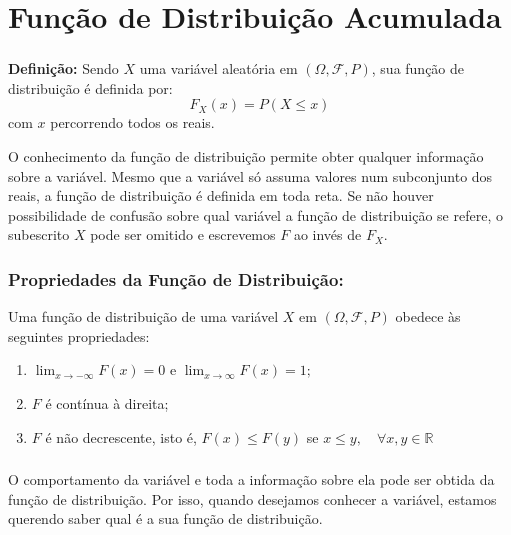 \documentclass[14pt,aspectratio=1610]{beamer}
\begin{document}
\section{Função de Distribuição Acumulada}
\begin{frame}{}
\frametitle{}
\begin{block}{}
\justifying
\textbf{Definição:} Sendo $X$ uma variável aleatória em $(\Omega, \mathcal{F}, P)$, sua função de distribuição é definida por: $$F_{X}(x)=P(X\leq x)$$ com $x$ percorrendo 
todos os reais.

O conhecimento da função de distribuição permite obter qualquer informação sobre a variável. Mesmo que a variável só assuma valores num subconjunto dos reais, a 
função de distribuição é definida em toda reta. Se não houver possibilidade de confusão sobre qual variável a função de distribuição se refere, o subescrito $X$ pode 
ser omitido e escrevemos $F$ ao invés de $F_{X}.$
\end{block}
\end{frame}

\begin{frame}{}
\frametitle{Propriedades da Função de Distribuição:}
\begin{block}{}
\justifying
Uma função de distribuição de uma variável $X$ em $(\Omega, \mathcal{F}, P)$ obedece às seguintes propriedades:

\begin{enumerate}
\item $\displaystyle \lim_{x \to -\infty}F(x)=0$ e 
      $\displaystyle \lim_{x \to \infty }F(x)=1;$\pause
\item $F$ é contínua à direita;\pause
\item $F$ é não decrescente, isto é, $F(x)\leq F(y)$ se $x\leq y,\quad \forall x,y \in \mathbb{R}$
\end{enumerate}
\end{block}
\end{frame}

\begin{frame}{}
\frametitle{}
\begin{block}{}
\justifying
O comportamento da variável e toda a informação sobre ela pode ser obtida da função de distribuição. Por isso, quando desejamos conhecer a variável, estamos querendo 
saber qual é a sua função de distribuição.
\end{block}
\end{frame}
\end{document}
